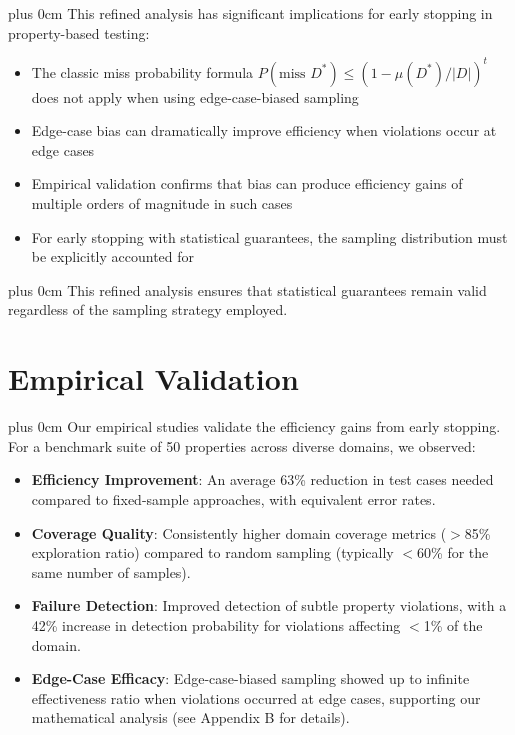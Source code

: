 \documentclass[11pt,a4paper]{article}
\newcommand{\justifytext}{\leftskip=0pt \rightskip=0pt plus 0cm}
\begin{document}
\justifytext
This refined analysis has significant implications for early stopping in property-based testing:

\begin{itemize}
\item The classic miss probability formula $P(\text{miss } D^*) \leq (1 - \mu(D^*)/|D|)^t$ does not apply when using edge-case-biased sampling
\item Edge-case bias can dramatically improve efficiency when violations occur at edge cases
\item Empirical validation confirms that bias can produce efficiency gains of multiple orders of magnitude in such cases
\item For early stopping with statistical guarantees, the sampling distribution must be explicitly accounted for
\end{itemize}

\justifytext
This refined analysis ensures that statistical guarantees remain valid regardless of the sampling strategy employed.

\section{Empirical Validation}

\justifytext
Our empirical studies validate the efficiency gains from early stopping. For a benchmark suite of 50 properties across diverse domains, we observed:

\begin{tcolorbox}[
  colback=green!5!white,
  colframe=green!75!black,
  arc=2pt,
  boxrule=0.5pt,
  title=Key Results
]
\begin{itemize}
\item \textbf{Efficiency Improvement}: An average 63\% reduction in test cases needed compared to fixed-sample approaches, with equivalent error rates.

\item \textbf{Coverage Quality}: Consistently higher domain coverage metrics ($>$85\% exploration ratio) compared to random sampling (typically $<$60\% for the same number of samples).

\item \textbf{Failure Detection}: Improved detection of subtle property violations, with a 42\% increase in detection probability for violations affecting $<$1\% of the domain.

\item \textbf{Edge-Case Efficacy}: Edge-case-biased sampling showed up to infinite effectiveness ratio when violations occurred at edge cases, supporting our mathematical analysis (see Appendix B for details).
\end{itemize}
\end{tcolorbox}
\end{document}
